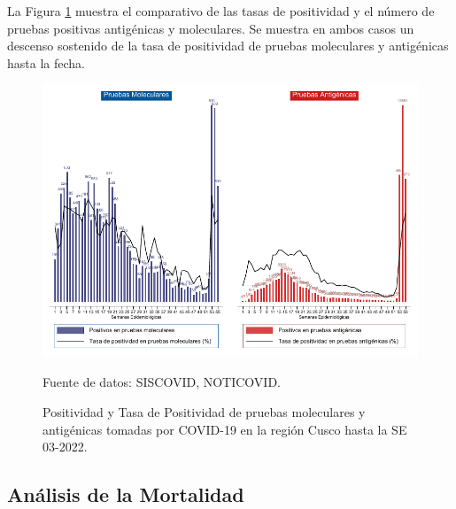 \documentclass[12pt,a4paper,openany]{book}
\begin{document}
La Figura \ref{fig:positividad_ambas} muestra el comparativo de las tasas de positividad y el número de pruebas positivas antigénicas y moleculares. Se muestra en ambos casos un descenso sostenido de la tasa de positividad de pruebas moleculares y antigénicas hasta la fecha. 
\begin{landscape}
   \begin{figure}[h]
	\caption{Positividad y Tasa de Positividad de pruebas moleculares y antigénicas tomadas por COVID-19 en la región Cusco hasta la SE 03-2022.}\label{fig:positividad_ambas}
   	\begin{center}
   		\includegraphics[width=0.85\linewidth]{../figuras/positividad_ambas.pdf}
   	\end{center}
   	{\footnotesize {Fuente de datos: SISCOVID, NOTICOVID.}}
   \end{figure}
\end{landscape}
\clearpage

	\subsection*{Análisis de la Mortalidad}
\end{document}
